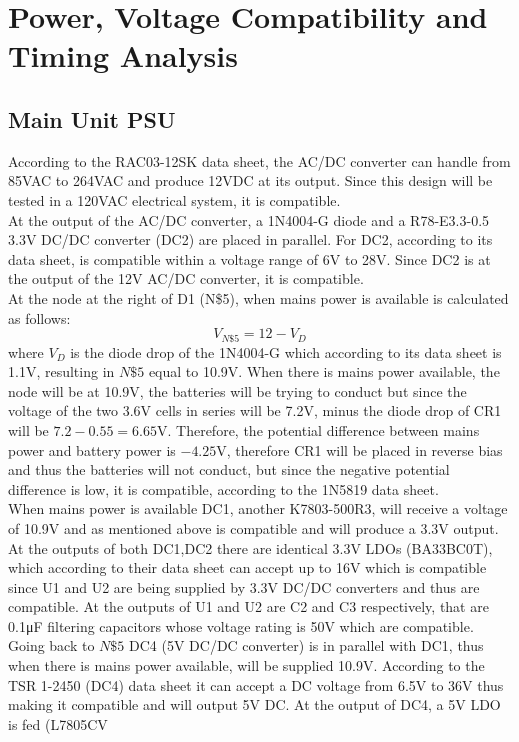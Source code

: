 \section{Power, Voltage Compatibility and Timing Analysis}
\subsection{Main Unit PSU}
According to the RAC03-12SK data sheet\cite{RAC0312SK}, the AC/DC converter can handle from 85\si{\V}AC to 264\si{\V}AC and produce 12\si{\V}DC at its output. Since this design will be tested in a 120\si{\V}AC electrical system, it is compatible.\\ At the output of the AC/DC converter, a 1N4004-G diode\cite{1N4004G} and a R78-E3.3-0.5 3.3\si{\V} DC/DC converter\cite{R78E330} (DC2) are placed in parallel. For DC2, according to its data sheet, is compatible within a voltage range of 6\si{\V} to 28\si{\V}. Since DC2 is at the output of the 12\si{\V} AC/DC converter, it is compatible.\\ At the node at the right of D1 (N\$5), when mains power is available is calculated as follows:
\begin{equation}
  V_{N\$5} = 12 -  V_{D}
  \label{eq:mains-batt-node-eqation-mains-available}
\end{equation}
where $V_{D}$ is the diode drop of the 1N4004-G which according to its data sheet is 1.1\si{\V}, resulting in $N\$5$ equal to 10.9\si{\V}. When there is mains power available, the node will be at 10.9\si{\V}, the batteries will be trying to conduct but since the voltage of the two 3.6\si{\V} cells in series will be 7.2\si{\V}, minus the diode drop of CR1\cite{1N5819} will be $7.2 - 0.55 = 6.65\si{\V}$. Therefore, the potential difference between mains power and battery power is $-4.25\si{\V}$, therefore CR1 will be placed in reverse bias and thus the batteries will not conduct, but since the negative potential difference is low, it is compatible, according to the 1N5819 data sheet\cite{1N5819}.\\ When mains power is available DC1, another K7803-500R3, will receive a voltage of 10.9\si{\V} and as mentioned above is compatible and will produce a 3.3\si{\V} output. At the outputs of both DC1,DC2 there are identical 3.3\si{\V} LDOs (BA33BC0T)\cite{BA33BC0T}, which according to their data sheet can accept up to 16\si{\V} which is compatible since U1 and U2 are being supplied by 3.3\si{\V} DC/DC converters and thus are compatible. At the outputs of U1 and U2 are C2 and C3 respectively, that are 0.1\si{\micro\farad} filtering capacitors whose voltage rating is 50\si{\V} which are compatible.\\ Going back to $N\$5$ DC4 (5\si{\V} DC/DC converter) is in parallel with DC1, thus when there is mains power available, will be supplied 10.9\si{\V}. According to the TSR 1-2450 (DC4) data sheet\cite{TSR12450} it can accept a DC voltage from 6.5\si{\V} to 36\si{\V} thus making it compatible and will output 5\si{\V} DC. At the output of DC4, a 5\si{\V} LDO is fed (L7805CV
